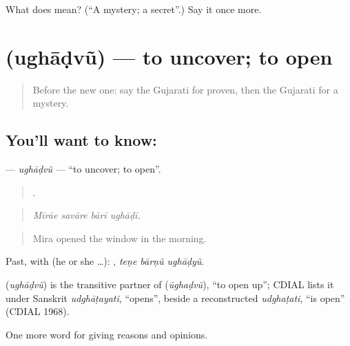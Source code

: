 \begin{tcolorbox}[breakable,colback=teal!4,colframe=teal!35!black,title={Before you move on}]
What does  mean? (\textquotedblleft{}A mystery; a secret\textquotedblright{}.) Say it once more.
\end{tcolorbox}
\section[\texorpdfstring{\gu{ઉઘાડવું} (ughāḍvũ)}{ઉઘાડવું (ughāḍvũ)}]{ (ughāḍvũ) — to uncover; to open}

\label{lesson:GU-C364-ughadvu-uncover}



\begin{quote}
Before the new one: say the Gujarati for proven, then the Gujarati for a mystery.
\end{quote}

\subsection*{You'll want to know: }
\textbf{} — \emph{ughāḍvũ} — \textquotedblleft{}to uncover; to open\textquotedblright{}.

\begin{quote}
   .
\end{quote}

\begin{quote}
\emph{Mīrāe savāre bārī ughāḍī.}
\end{quote}

\begin{quote}
Mira opened the window in the morning.
\end{quote}

Past, with  (he or she …):   , \emph{teṇe bārṇũ ughāḍyũ}.

\begin{cousinweb}
\textbf{} (\emph{ughāḍvũ}) is the transitive partner of \textbf{} (\emph{ūghaḍvũ}), \textquotedblleft{}to open up\textquotedblright{}; CDIAL lists it under Sanskrit \emph{udghāṭayati}, \textquotedblleft{}opens\textquotedblright{}, beside a reconstructed \emph{udghaṭati}, \textquotedblleft{}is open\textquotedblright{} (CDIAL 1968).
\end{cousinweb}

\begin{grammarlens}[title={What you've built}]
One more word for giving reasons and opinions.
\end{grammarlens}

